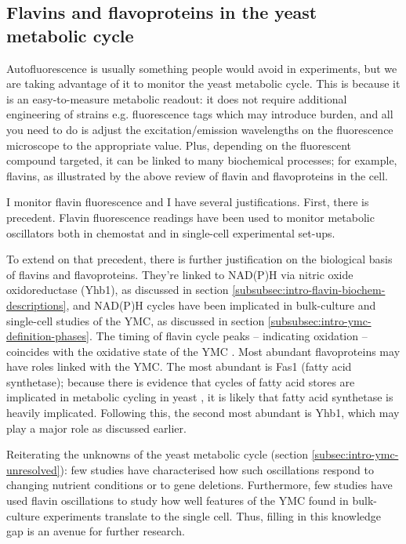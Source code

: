 \subsection{Flavins and flavoproteins in the yeast metabolic cycle}
\label{subsec:intro-flavin-ymc}

Autofluorescence is usually something people would avoid in experiments, but we are taking advantage of it to monitor the yeast metabolic cycle.
This is because it is an easy-to-measure metabolic readout: it does not require additional engineering of strains e.g. fluorescence tags which may introduce burden, and all you need to do is adjust the excitation/emission wavelengths on the fluorescence microscope to the appropriate value.
Plus, depending on the fluorescent compound targeted, it can be linked to many biochemical processes; for example, flavins, as illustrated by the above review of flavin and flavoproteins in the cell.

I monitor flavin fluorescence and I have several justifications.
First, there is precedent.
Flavin fluorescence readings have been used to monitor metabolic oscillators both in chemostat \citep{murrayRedoxRegulationRespiring2011} and in single-cell \citep{baumgartnerFlavinbasedMetabolicCycles2018} experimental set-ups.

To extend on that precedent, there is further justification on the biological basis of flavins and flavoproteins.
They're linked to NAD(P)H via nitric oxide oxidoreductase (Yhb1), as discussed in section \ref{subsubsec:intro-flavin-biochem-descriptions}, and NAD(P)H cycles have been implicated in bulk-culture \citep{tuLogicYeastMetabolic2005} %
and single-cell \citep{papagiannakisAutonomousMetabolicOscillations2017} studies of the YMC, as discussed in section \ref{subsubsec:intro-ymc-definition-phases}.
The timing of flavin cycle peaks -- indicating oxidation -- coincides with the oxidative state of the YMC \citep{murrayRedoxRegulationRespiring2011}.
Most abundant flavoproteins may have roles linked with the YMC.
The most abundant is Fas1 (fatty acid synthetase); because there is evidence that cycles of fatty acid stores are implicated in metabolic cycling in yeast \citep{campbellBuildingBlocksAre2020}, it is likely that fatty acid synthetase is heavily implicated.
Following this, the second most abundant is Yhb1, which may play a major role as discussed earlier.

Reiterating the unknowns of the yeast metabolic cycle (section \ref{subsec:intro-ymc-unresolved}):
few studies have characterised how such oscillations respond to changing nutrient conditions or to gene deletions.
Furthermore,
few studies have used flavin oscillations to study how well features of the YMC found in bulk-culture experiments translate to the single cell.
Thus, filling in this knowledge gap is an avenue for further research.

